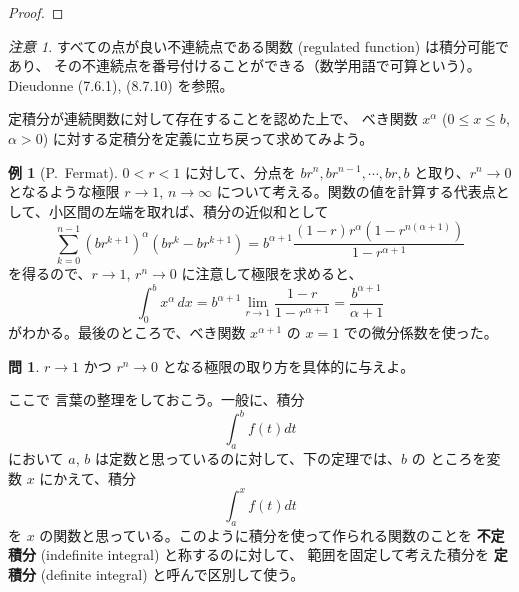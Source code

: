 \documentclass[a4paper]{jsarticle}
\theoremstyle{definition}
\newtheorem{Example}[Theorem]{例}
\newtheorem{Exercise}{問}%
\theoremstyle{remark}
\newtheorem{Remark}{注意}
\begin{document}
\begin{proof}
\end{proof}

\begin{Remark}
  すべての点が良い不連続点である関数 (regulated function) は積分可能であり、
  その不連続点を番号付けることができる（数学用語で可算という）。 Dieudonne (7.6.1), (8.7.10) を参照。%
\end{Remark}

定積分が連続関数に対して存在することを認めた上で、
べき関数 $x^\alpha$ ($0 \leq x \leq b$, $\alpha > 0$) に対する定積分を定義に立ち戻って求めてみよう。

\begin{Example}[P.~Fermat]
$0 < r < 1$ に対して、分点を $br^n, br^{n-1}, \cdots, br,b$ と取り、$r^n \to 0$ となるような極限 $r \to 1$, 
$n \to \infty$ について考える。関数の値を計算する代表点として、小区間の左端を取れば、積分の近似和として
\[ 
\sum_{k=0}^{n-1} (br^{k+1})^\alpha (br^k - br^{k+1}) 
= b^{\alpha+1} \frac{(1-r)r^\alpha(1-r^{n(\alpha+1)})}{1 - r^{\alpha+1}} 
\]
を得るので、$r \to 1$, $r^n \to 0$ に注意して極限を求めると、
\[ 
\int_0^b x^\alpha\, dx = b^{\alpha+1} \lim_{r \to 1} \frac{1-r}{1-r^{\alpha+1}} = \frac{b^{\alpha+1}}{\alpha+1}
\]
がわかる。最後のところで、べき関数 $x^{\alpha + 1}$ の $x=1$ での微分係数を使った。
\end{Example}

\begin{Exercise}
$r \to 1$ かつ $r^n \to 0$ となる極限の取り方を具体的に与えよ。%
\end{Exercise}

ここで 言葉の整理をしておこう。一般に、積分
\[
\int_a^b f(t) dt
\]
において $a$, $b$ は定数と思っているのに対して、下の定理では、$b$ の
ところを変数 $x$ にかえて、積分
\[
\int_a^x f(t)dt
\]
を $x$ の関数と思っている。このように積分を使って作られる関数のことを
\textbf{不定積分} (indefinite integral) と称するのに対して、
範囲を固定して考えた積分を
\textbf{定積分} (definite integral) と呼んで区別して使う。
\end{document}
